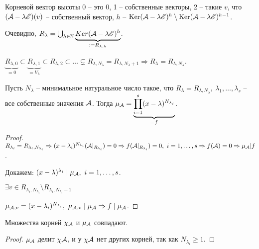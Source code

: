 \documentclass[main]{subfiles}
\begin{document}
Корневой вектор высоты 0 -- это 0, 1 -- собственные векторы, 2 -- такие $v$, что $(\mathcal{A} - \lambda \mathscr{E})(v)$ -- собственный вектор,
$h$ -- $\operatorname{Ker}(\mathcal{A} - \lambda \mathscr{E})^h \setminus \operatorname{Ker}(\mathcal{A} - \lambda \mathscr{E})^{h-1}$.

Очевидно, $R_{\lambda} = \bigcup_{h \in \mathbb{N}} \underbrace{Ker(\mathcal{A} - \lambda \mathscr{E})^h}_{:= R_{\lambda, h}}$.

$\underbrace{R_{\lambda, 0}}_{=0} \subset \underbrace{R_{\lambda, 1}}_{= V_{\lambda}} \subset R_{\lambda, 2} \subset \ldots \subsetneq  R_{\lambda, N_{\lambda}} = R_{\lambda, N_{\lambda} + 1} \Rightarrow
  R_{\lambda} = R_{\lambda, N_{\lambda}}$.

\begin{proposition}
  Пусть $N_{\lambda}$ -- минимальное натуральное число такое, что $R_{\lambda} = R_{\lambda, N_{\lambda}}, \ \lambda_1, \ldots, \lambda_s$ -- все собственные значения $\mathcal{A}$.
  Тогда ${\mu}_{\mathcal{A}} = \underbrace{\prod_{i = 1}^s(x-\lambda)^{N_{\lambda_i}}}_{=f}$.
\end{proposition}

\begin{proof}
  $R_{\lambda_i} = R_{\lambda_i, N_{\lambda_i}} \Rightarrow (x - \lambda_i)^{N_{\lambda_i}}(\mathcal{A}|_{R_{\lambda_i}}) = 0 \Rightarrow
    f(\mathcal{A}|_{R_{\lambda_i}}) = 0, \ i = 1, \ldots, s \Rightarrow f(\mathcal{A}) = 0 \Rightarrow \mu_{\mathcal{A}} | f$.

  Докажем: $(x - \lambda)^{\lambda_i} \mid \mu_{\mathcal{A}}, \ i = 1, \ldots, s$.

  $\exists v \in R_{\lambda_i, N_{\lambda_i}}\setminus R_{\lambda_i, N_{\lambda_i} - 1}$

  $\mu_{\mathcal{A}, v} = (x - \lambda_i)^{N_{\lambda_i}}, \ \mu_{\mathcal{A}, v} \mid \mu_{\mathcal{A}} \Rightarrow f \mid \mu_{\mathcal{A}}$.
\end{proof}

\begin{corollary}
  Множества корней $\chi_{\mathcal{A}}$ и $\mu_{\mathcal{A}}$ совпадают.
\end{corollary}

\begin{proof}
  $\mu_{\mathcal{A}}$ делит $\chi{\mathcal{A}}$, и у $\chi{\mathcal{A}}$ нет других корней, так как $N_{\lambda_i} \geq  1$.
\end{proof}
\end{document}
